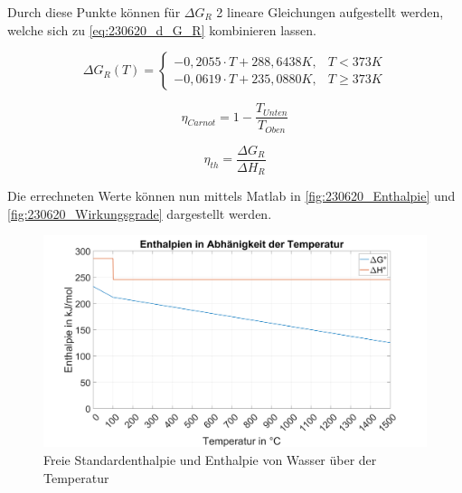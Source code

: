 Durch diese Punkte können für $\Delta G_R$ 2 lineare Gleichungen aufgestellt werden, welche sich zu \autoref{eq:230620_d_G_R} kombinieren lassen.

\begin{equation}
    \Delta G_R(T) =
    \begin{cases}
        -0,2055 \cdot T + 288,6438 K, & T < 373 K \\
        -0,0619 \cdot T + 235,0880 K, & T \geq 373 K
    \end{cases}
    \label{eq:230620_d_G_R}
\end{equation}

\begin{equation}
    \eta_{Carnot} = 1 - \frac{T_{Unten}}{T_{Oben}}
    \label{eq:230620_Carnot}
\end{equation}

\begin{equation}
    \eta_{th} = \frac{\Delta G_R}{\Delta H_R}
    \label{eq:230620_Gibbs-Helmholtz}
\end{equation}

Die errechneten Werte können nun mittels Matlab in \autoref{fig:230620_Enthalpie} und \autoref{fig:230620_Wirkungsgrade} dargestellt werden.

\begin{figure}[H]
    \centering
    \includegraphics[width=\textwidth]{Abbildungen/Enthalpien.png}
    \caption{Freie Standardenthalpie und Enthalpie von Wasser über der Temperatur}
    \label{fig:230620_Enthalpie}
\end{figure}


